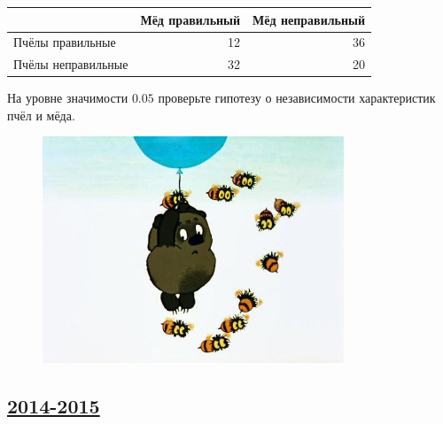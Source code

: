 \begin{enumerate}
\begin{center}
\begin{tabular}{lrr}
\toprule
 & Мёд правильный & Мёд неправильный \\
\midrule
Пчёлы правильные & 12	& 36 \\
Пчёлы неправильные & 32	& 20 \\
\bottomrule
\end{tabular}
\end{center}

На уровне значимости $0.05$ проверьте гипотезу о независимости характеристик пчёл и мёда.

\begin{figure}[b]
\centering
\includegraphics[width=9cm]{images/winnie_kr_4}
\end{figure}
\end{enumerate}



\newpage
\subsection[2014-2015]{\hyperref[sec:sol_kr_04_2014_2015]{2014-2015}}
\label{sec:kr_04_2014_2015}

